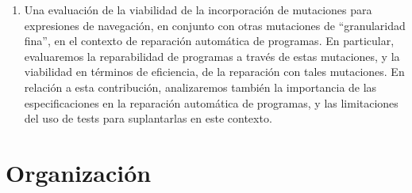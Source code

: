 \begin{enumerate}
    \item Una evaluaci\'on de la viabilidad de la incorporaci\'on de mutaciones para expresiones de navegaci\'on, en conjunto con otras mutaciones de ``granularidad fina'', en el contexto de reparaci\'on autom\'atica de programas. En particular, evaluaremos la reparabilidad de programas a trav\'es de estas mutaciones, y la viabilidad en t\'erminos de eficiencia, de la reparaci\'on con tales mutaciones. En relaci\'on a esta contribuci\'on, analizaremos tambi\'en la importancia de las especificaciones en la reparaci\'on autom\'atica de programas, y las limitaciones del uso de tests para suplantarlas en este contexto. 
 
\end{enumerate}



\section{Organizaci\'on}
\label{sec:intro.organizacion}

